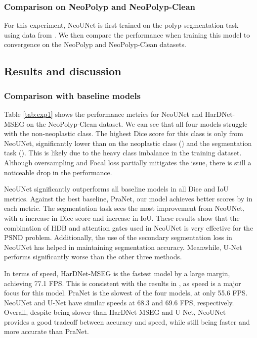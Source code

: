 \documentclass[runningheads]{llncs}
\newcommand{\ModelName}{NeoUNet\xspace}
\newcommand{\DatasetName}{NeoPolyp\xspace}
\newcommand{\CleanDatasetName}{NeoPolyp-Clean\xspace}
\begin{document}
	\subsubsection{Comparison on \DatasetName and \CleanDatasetName}
	For this experiment, \ModelName is first trained on the polyp segmentation task using data from \cite{jha2019resunet++}. We then compare the performance when training this model to convergence on the \DatasetName and \CleanDatasetName datasets.

	\subsection{Results and discussion}

	\subsubsection{Comparison with baseline models}
	Table \ref{tab:exp1} shows the performance metrics for \ModelName and HarDNet-MSEG on the \CleanDatasetName dataset. We can see that all four models struggle with the non-neoplastic class. The highest Dice score for this class is only  from \ModelName, significantly lower than on the neoplastic class () and the segmentation task (). This is likely due to the heavy class imbalance in the training dataset. Although oversampling and Focal loss partially mitigates the issue, there is still a noticeable drop in the performance.

	\ModelName significantly outperforms all baseline models in all Dice and IoU metrics. Against the best baseline, PraNet, our model achieves better scores by  in each metric. The segmentation task sees the most improvement from \ModelName, with a  increase in Dice score and  increase in IoU. These results show that the combination of HDB and attention gates used in \ModelName is very effective for the PSND problem. Additionally, the use of the secondary segmentation loss in \ModelName has helped in maintaining segmentation accuracy. Meanwhile, U-Net performs significantly worse than the other three methods.

	In terms of speed, HarDNet-MSEG is the fastest model by a large margin, achieving 77.1 FPS. This is consistent with the results in \cite{huang2021hardnet}, as speed is a major focus for this model. PraNet is the slowest of the four models, at only 55.6 FPS. \ModelName and U-Net have similar speeds at 68.3 and 69.6 FPS, respectively. Overall, despite being slower than HarDNet-MSEG and U-Net, \ModelName provides a good tradeoff between accuracy and speed, while still being faster and more accurate than PraNet.
\end{document}

